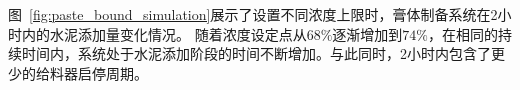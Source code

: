 图~\ref{fig:paste_bound_simulation}展示了设置不同浓度上限时，膏体制备系统在2小时内的水泥添加量变化情况。
随着浓度设定点从$68\%$逐渐增加到$74\%$，在相同的持续时间内，系统处于水泥添加阶段的时间不断增加。与此同时，2小时内包含了更少的给料器启停周期。

